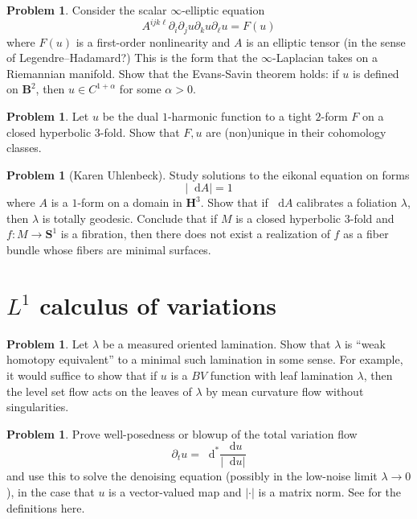 \documentclass[reqno,11pt]{amsart}
\newcommand{\Hyp}{\mathbf H}
\newcommand{\Sph}{\mathbf S}
\newcommand{\Ball}{\mathbf{B}}
\newcommand*\dif{\mathop{}\!\mathrm{d}}
\theoremstyle{definition}
\newtheorem{problem}[theorem]{Problem}
\numberwithin{equation}{section}
\begin{document}
\begin{problem}
Consider the scalar $\infty$-elliptic equation 
$$A^{ijk\ell} \partial_i \partial_j u \partial_k u \partial_\ell u = F(u)$$
where $F(u)$ is a first-order nonlinearity and $A$ is an elliptic tensor (in the sense of Legendre--Hadamard?)
This is the form that the $\infty$-Laplacian takes on a Riemannian manifold.
Show that the Evans-Savin theorem \cite{Evans08} holds: if $u$ is defined on $\Ball^2$, then $u \in C^{1 + \alpha}$ for some $\alpha > 0$.
\end{problem}

\begin{problem}
Let $u$ be the dual $1$-harmonic function to a tight $2$-form $F$ on a closed hyperbolic $3$-fold.
Show that $F, u$ are (non)unique in their cohomology classes.
\end{problem}

\begin{problem}[Karen Uhlenbeck]
Study solutions to the eikonal equation on forms 
$$|\dif A| = 1$$
where $A$ is a $1$-form on a domain in $\Hyp^3$.
Show that if $\dif A$ calibrates a foliation $\lambda$, then $\lambda$ is totally geodesic.
Conclude that if $M$ is a closed hyperbolic $3$-fold and $f: M \to \Sph^1$ is a fibration, then there does not exist a realization of $f$ as a fiber bundle whose fibers are minimal surfaces.
\end{problem}

\section{\texorpdfstring{$L^1$}{L-1} calculus of variations}
\begin{problem}
Let $\lambda$ be a measured oriented lamination.
Show that $\lambda$ is ``weak homotopy equivalent'' to a minimal such lamination in some sense.
For example, it would suffice to show that if $u$ is a $BV$ function with leaf lamination $\lambda$, then the level set flow acts on the leaves of $\lambda$ by mean curvature flow without singularities.
\end{problem}

\begin{problem}
Prove well-posedness or blowup of the total variation flow 
$$\partial_t u = \dif^* \frac{\dif u}{|\dif u|}$$
and use this to solve the denoising equation (possibly in the low-noise limit $\lambda \to 0$), in the case that $u$ is a vector-valued map and $|\cdot|$ is a matrix norm.
See \cite{Novaga04} for the definitions here.
\end{problem}
\end{document}
